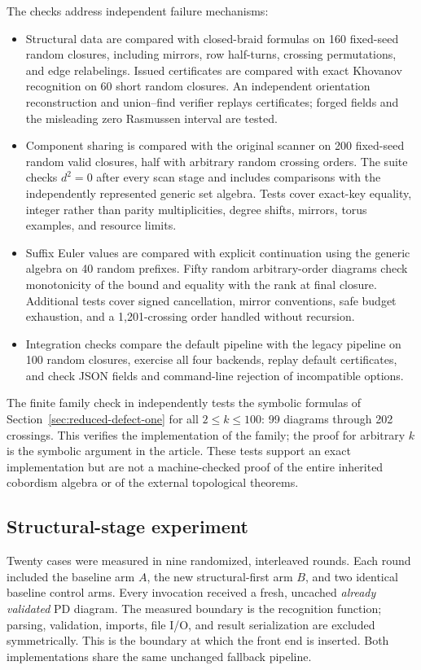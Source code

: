 The checks address independent failure mechanisms:
\begin{itemize}
\item Structural data are compared with closed-braid formulas on 160
fixed-seed random closures, including mirrors, row half-turns, crossing
permutations, and edge relabelings. Issued certificates are compared with
exact Khovanov recognition on 60 short random closures. An independent
orientation reconstruction and union--find verifier replays certificates;
forged fields and the misleading zero Rasmussen interval are tested.
\item Component sharing is compared with the original scanner on 200
fixed-seed random valid closures, half with arbitrary random crossing orders.
The suite checks $d^2=0$ after every scan stage and includes comparisons with
the independently represented generic set algebra. Tests cover exact-key
equality, integer rather than parity multiplicities, degree shifts,
mirrors, torus examples, and resource limits.
\item Suffix Euler values are compared with explicit continuation using
the generic algebra on 40 random prefixes. Fifty random arbitrary-order
diagrams check monotonicity of the bound and equality with the rank at final
closure. Additional tests cover signed cancellation, mirror conventions,
safe budget exhaustion, and a 1,201-crossing order handled without recursion.
\item Integration checks compare the default pipeline with the legacy
pipeline on 100 random closures, exercise all four backends, replay default
certificates, and check JSON fields and command-line rejection of
incompatible options.
\end{itemize}
The finite family check in 
independently tests the symbolic formulas of
Section~\ref{sec:reduced-defect-one} for all $2\le k\le100$: 99 diagrams
through 202 crossings. This verifies the implementation of the family;
the proof for arbitrary $k$ is the symbolic argument in the article.
These tests support an exact implementation but are not a machine-checked
proof of the entire inherited cobordism algebra or of the external
topological theorems.

\subsection{Structural-stage experiment}
Twenty cases were measured in nine randomized, interleaved rounds. Each
round included the baseline arm $A$, the new structural-first arm $B$, and
two identical baseline control arms. Every invocation received a fresh,
uncached \emph{already validated} PD diagram. The measured boundary is the
recognition function; parsing, validation, imports, file I/O, and result
serialization are excluded symmetrically. This is the boundary at which
the front end is inserted. Both implementations share the same unchanged
fallback pipeline.

